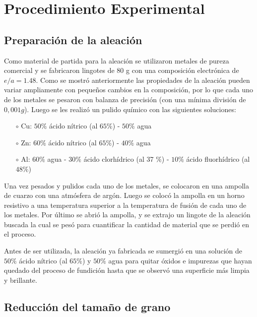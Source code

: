 \documentclass[a4paper,12pt,fleqn,twoside,openany]{book}
\begin{document}
\chapter{Procedimiento Experimental}



\section{Preparación de la aleación} \label{preparacion_aleacion}


Como material de partida para la aleación se utilizaron metales de pureza comercial y se fabricaron lingotes de 80 g con una composición electrónica de 
$e/a=1.48$. Como se mostró anteriormente las propiedades de la aleación pueden variar ampliamente 
con pequeños cambios en la composición, por lo que cada uno de los metales se pesaron con balanza de precisión (con una mínima división de $0,001g$). 
Luego se les realizó un pulido químico con las siguientes soluciones:
\begin{itemize}
 \item[$\circ$] Cu: $50 \%$ ácido nítrico (al $65 \%$) - $50 \%$ agua
 \item[$\circ$] Zn: $60 \%$ ácido nítrico (al $65 \%$) - $40 \%$ agua
 \item[$\circ$] Al: $60 \%$ agua - $30 \%$ ácido clorhídrico (al 37 \%) - $10 \%$ ácido fluorhídrico (al $48 \%$)
\end{itemize}

Una vez pesados y pulidos cada uno de los metales, se colocaron en una ampolla de cuarzo con una atmósfera de argón. Luego se colocó la ampolla en 
un horno resistivo a una temperatura superior a la temperatura de fusión de cada uno de los metales. Por último se abrió la ampolla, y se extrajo un 
lingote de la aleación buscada la cual se pesó para cuantificar la cantidad de material que se perdió en el proceso.  

Antes de ser utilizada, la aleación ya fabricada se sumergió en una solución de $50 \%$ ácido nítrico (al $65 \%$) y 
$50 \%$ agua para quitar óxidos e impurezas que hayan quedado del proceso de fundición hasta que se observó una superficie más limpia y brillante.

\section{Reducción del tamaño de grano}
\end{document}
